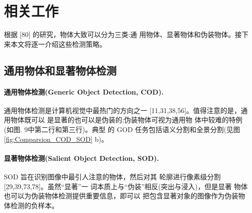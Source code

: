\documentclass[final]{cvpr}
\newcommand{\mypara}[1]{\paragraph{#1.}}
\renewcommand{\figref}[1]{图\ref{#1}}
\begin{document}
\section{相关工作}
\label{sec:RelatedWorks}
根据 [80] 的研究，物体大致可以分为三类:通 用物体、显著物体和伪装物体。接下来本文将逐一介绍这些检测策略。
\subsection{通用物体和显著物体检测}
\mypara{通用物体检测(Generic Object Detection, COD)} 通用物体检测是计算机视觉中最热门的方向之一 [11,31,38,56]。值得注意的是，通用物体既可以 是显著的也可以是伪装的;伪装物体可视为通用物 体中较难的特例(如图. 9中第二行和第三行)。典型 的 GOD 任务包括语义分割和全景分割(见\figref{fig:Comparsion_COD_SOD} b)。
\mypara{显著物体检测(Salient Object Detection, SOD)}SOD 旨在识别图像中最引人注意的物体，然后对其 轮廓进行像素级分割 [29,39,73,78]。虽然“显著”一 词本质上与“伪装”相反(突出与浸入)，但是显著 物体也可以为伪装物体检测提供重要信息，即可以 把包含显著对象的图像作为伪装物体检测的负样本。
\end{document}
